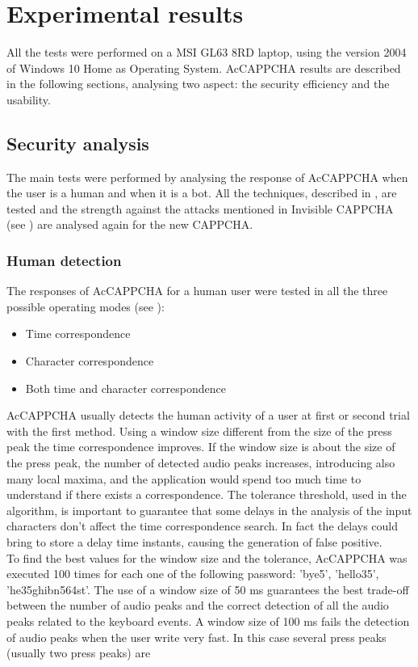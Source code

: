 \chapter{Experimental results}\label{chapter:Results}
All the tests were performed on a MSI GL63 8RD laptop, using the version 2004 of Windows 10 Home as Operating System. AcCAPPCHA results are described in the following sections, analysing two aspect: the security efficiency and the usability.

\section{Security analysis}
The main tests were performed by analysing the response of AcCAPPCHA when the user is a human and when it is a bot. All the techniques, described in , are tested and the strength against the attacks mentioned in Invisible CAPPCHA (see ) are analysed again for the new CAPPCHA.  

\subsection{Human detection}\label{Results:human}
The responses of AcCAPPCHA for a human user were tested in all the three possible operating modes (see ): 
\begin{itemize}
\item{Time correspondence}
\item{Character correspondence}
\item{Both time and character correspondence}
\end{itemize}
AcCAPPCHA usually detects the human activity of a user at first or second trial  with the first method. Using a window size different from the size of the press peak the time correspondence improves. If the window size is about the size of the press peak, the number of detected audio peaks increases, introducing also many local maxima, and the application would spend too much time to understand if there exists a correspondence. The tolerance threshold, used in the algorithm, is important to guarantee that some delays in the analysis of the input characters don't affect the time correspondence search. In fact the delays could bring to store a delay time instants, causing the generation of false positive.\\
To find the best values for the window size and the tolerance, AcCAPPCHA was executed 100 times for each one of the following password: 'bye5', 'hello35', 'he35ghibn564st'. The use of a window size of 50 ms guarantees the best trade-off between the number of audio peaks and the correct detection of all the audio peaks related to the keyboard events. A window size of 100 ms fails the detection of audio peaks when the user write very fast. In this case several press peaks (usually two press peaks) are 


